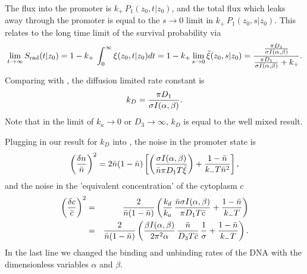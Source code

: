 The flux into the promoter is $k_+\,P_1(z_0,t|z_0)$, and the total flux which leaks away through the promoter is equal to the $s \to 0$ limit in $k_+ \,P_1(z_0,s|z_0)$. This relates to the long time limit of the survival probability via
\begin{equation}
  \lim_{t \to \infty}S_{\rm rad}(t|z_0) = 1 - k_+ \, \int_0^{\infty} \xi(z_0, t|z_0) dt = 1 - k_+ \lim_{s \to 0} \tilde{\xi}(z_0, s|z_0) = \frac{\frac{\pi D_1}{\sigma I(\alpha,\beta)}}{\frac{\pi D_1}{\sigma I(\alpha,\beta)} + k_+}.
\end{equation}
Comparing with , the diffusion limited rate constant is
\begin{equation}
 k_D = \frac{\pi D_1}{\sigma I(\alpha,\beta)}.
 \elabel{kDFullJ}
\end{equation}
Note that in the limit of $k_a\to0$ or $D_3\to\infty$, $k_D$ is equal to the well mixed result.

Plugging in our result for $k_D$ into , the noise in the promoter state is
\begin{equation}
 \elabel{NoiseProFull}
 \left( \frac{\delta n}{\bar{n}} \right)^2 = 2 \bar{n}(1-\bar{n})\left[\left( \frac{\sigma I(\alpha,\beta)}{\bar{n} \pi D_1 T \bar{\xi}} \right)+\frac{1-\bar{n}}{k_- T \bar{n}^2} \right],
\end{equation}
and the noise in the 'equivalent concentration' of the cytoplasm $c$
\begin{eqnarray}
 \elabel{NoiseCFull} 
 \left( \frac{\delta c}{\bar{c}} \right)^2 & = & \frac{2}{\bar{n}(1-\bar{n})} \left( \frac{k_d}{k_a} \, \frac{\bar{n} \sigma I(\alpha,\beta)}{\pi D_1 T \bar{c}} + \frac{1-\bar{n}}{k_- T}  \right) \\
 \elabel{NoiseCFull2}
 & = & \frac{2}{\bar{n}(1-\bar{n})} \left( \frac{\beta I(\alpha,\beta)}{2 \pi^2 \alpha} \, \frac{\bar{n}}{D_3 T \bar{c}} \, \frac{1}{\sigma} + \frac{1-\bar{n}}{k_- T}  \right).
\end{eqnarray}
In the last line we changed the binding and unbinding rates of the DNA with the dimensionless variables $\alpha$ and $\beta$.


